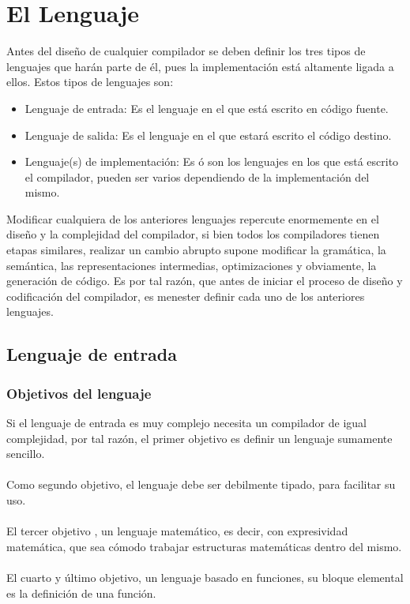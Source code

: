 
\chapter{El Lenguaje}


Antes del diseño de cualquier compilador se deben definir los tres tipos de lenguajes que harán parte de él, pues la implementación está altamente ligada a ellos. Estos tipos de lenguajes son:

\begin{itemize}
	\item Lenguaje de entrada: Es el lenguaje en el que está escrito en código fuente.
	\item Lenguaje de salida: Es el lenguaje en el que estará escrito el código destino.
	\item Lenguaje(s) de implementación: Es ó son los lenguajes en los que está escrito el compilador, pueden ser varios dependiendo de la implementación del mismo.
\end{itemize}

Modificar cualquiera de los anteriores lenguajes repercute enormemente en el diseño y la complejidad del compilador, si bien todos los compiladores tienen etapas similares, realizar un cambio abrupto supone modificar la gramática, la semántica, las representaciones intermedias, optimizaciones y obviamente, la generación de código.
Es por tal razón, que antes de iniciar el proceso de diseño y codificación del compilador, es menester definir cada uno de los anteriores lenguajes.

\section{Lenguaje de entrada}
	\subsection{Objetivos del lenguaje}
	
	Si el lenguaje de entrada es muy complejo necesita un compilador de igual complejidad, por tal razón, el primer objetivo es definir un lenguaje sumamente sencillo.\\\\
	\noindent
	Como segundo objetivo, el lenguaje debe ser debilmente tipado, para facilitar su uso.\\\\
	\noindent
	El tercer objetivo , un lenguaje matemático, es decir, con expresividad matemática, que sea cómodo trabajar estructuras matemáticas dentro del mismo.\\\\
	\noindent
	El cuarto y último objetivo, un lenguaje basado en funciones, su bloque elemental es la definición de una función.
	
